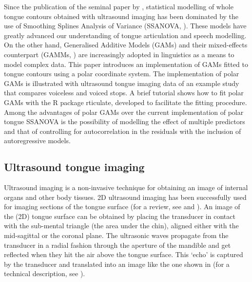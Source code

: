 \documentclass[11pt,]{article}
\begin{document}
Since the publication of the seminal paper by \citet{davidson2006},
statistical modelling of whole tongue contours obtained with ultrasound
imaging has been dominated by the use of Smoothing Splines Analysis of
Variance (SSANOVA, \citealt{gu2013}). These models have greatly advanced
our understanding of tongue articulation and speech modelling. On the
other hand, Generalised Additive Models (GAMs) and their mixed-effects
counterpart (GAMMs, \citealt{wood2006}) are increasingly adopted in
linguistics as a means to model complex data. This paper introduces an
implementation of GAMs fitted to tongue contours using a polar
coordinate system. The implementation of polar GAMs is illustrated with
ultrasound tongue imaging data of an example study that compares
voiceless and voiced stops. A brief tutorial shows how to fit polar GAMs
with the R package rticulate, developed to facilitate the fitting
procedure. Among the advantages of polar GAMs over the current
implementation of polar tongue SSANOVA is the possibility of modelling
the effect of multiple predictors and that of controlling for
autocorrelation in the residuals with the inclusion of autoregressive
models.

\hypertarget{ultrasound-tongue-imaging}{%
\subsection{Ultrasound tongue imaging}\label{ultrasound-tongue-imaging}}

Ultrasound imaging is a non-invasive technique for obtaining an image of
internal organs and other body tissues. 2D ultrasound imaging has been
successfully used for imaging sections of the tongue surface (for a
review, see \citealt{gick2002} and \citealt{lulich2018}). An image of
the (2D) tongue surface can be obtained by placing the transducer in
contact with the sub-mental triangle (the area under the chin), aligned
either with the mid-sagittal or the coronal plane. The ultrasonic waves
propagate from the transducer in a radial fashion through the aperture
of the mandible and get reflected when they hit the air above the tongue
surface. This `echo' is captured by the transducer and translated into
an image like the one shown in  (for a technical
description, see \citealt{stone2005}).
\end{document}
